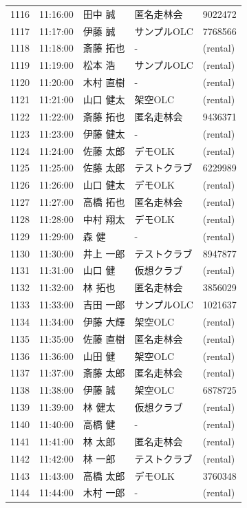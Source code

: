 \documentclass[a4paper,10pt]{ltjsarticle}
\begin{document}
\begin{longtable}{rl>{\raggedright\arraybackslash}p{}>{\raggedright\arraybackslash}p{}l}
1116 & 11:16:00 & 田中 誠 & 匿名走林会 & 9022472 \\
1117 & 11:17:00 & 伊藤 誠 & サンプルOLC & 7768566 \\
1118 & 11:18:00 & 斎藤 拓也 & - & (rental) \\
1119 & 11:19:00 & 松本 浩 & サンプルOLC & (rental) \\
1120 & 11:20:00 & 木村 直樹 & - & (rental) \\
1121 & 11:21:00 & 山口 健太 & 架空OLC & (rental) \\
1122 & 11:22:00 & 斎藤 拓也 & 匿名走林会 & 9436371 \\
1123 & 11:23:00 & 伊藤 健太 & - & (rental) \\
1124 & 11:24:00 & 佐藤 太郎 & デモOLK & (rental) \\
1125 & 11:25:00 & 佐藤 太郎 & テストクラブ & 6229989 \\
1126 & 11:26:00 & 山口 健太 & デモOLK & (rental) \\
1127 & 11:27:00 & 高橋 拓也 & 匿名走林会 & (rental) \\
1128 & 11:28:00 & 中村 翔太 & デモOLK & (rental) \\
1129 & 11:29:00 & 森 健 & - & (rental) \\
1130 & 11:30:00 & 井上 一郎 & テストクラブ & 8947877 \\
1131 & 11:31:00 & 山口 健 & 仮想クラブ & (rental) \\
1132 & 11:32:00 & 林 拓也 & 匿名走林会 & 3856029 \\
1133 & 11:33:00 & 吉田 一郎 & サンプルOLC & 1021637 \\
1134 & 11:34:00 & 伊藤 大輝 & 架空OLC & (rental) \\
1135 & 11:35:00 & 佐藤 直樹 & 匿名走林会 & (rental) \\
1136 & 11:36:00 & 山田 健 & 架空OLC & (rental) \\
1137 & 11:37:00 & 斎藤 太郎 & 匿名走林会 & (rental) \\
1138 & 11:38:00 & 伊藤 誠 & 架空OLC & 6878725 \\
1139 & 11:39:00 & 林 健太 & 仮想クラブ & (rental) \\
1140 & 11:40:00 & 高橋 健 & - & (rental) \\
1141 & 11:41:00 & 林 太郎 & 匿名走林会 & (rental) \\
1142 & 11:42:00 & 林 一郎 & テストクラブ & (rental) \\
1143 & 11:43:00 & 高橋 太郎 & デモOLK & 3760348 \\
1144 & 11:44:00 & 木村 一郎 & - & (rental) \\

\end{longtable}
\end{document}
